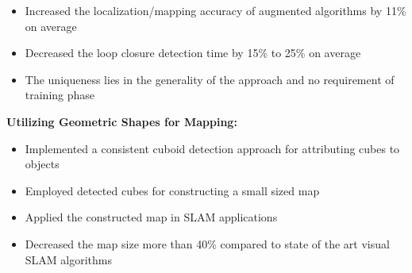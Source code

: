 \documentclass[10pt,a4paper,sans]{moderncv}        %
\begin{document}
{\begin{itemize}
\item Increased the localization/mapping accuracy of augmented algorithms by 11\% on average
\item Decreased the loop closure detection time by 15\% to 25\% on average 
\item The uniqueness lies in the generality of the approach and no requirement of training phase 
\end{itemize}
\hspace{5ex}\textbf{Utilizing Geometric Shapes for Mapping:}
\begin{itemize}
	\addtolength{\itemindent}{0.9cm}
\item Implemented a consistent cuboid detection approach for attributing cubes to objects
\item Employed detected cubes for constructing a small sized map%
\item Applied the constructed map in SLAM applications
\item Decreased the map size more than 40\% compared to state of the art visual SLAM algorithms
\end{itemize}}
\end{document}
